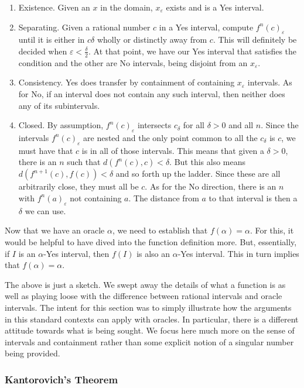 \documentclass[12pt]{article}
\begin{document}
\begin{enumerate}
    \item Existence. Given an $x$ in the domain, $x_\varepsilon$ exists and is a Yes interval. 
    \item Separating. Given a rational number $c$ in a Yes interval, compute $f^n (c)_\varepsilon$ until it is either in $c\delta$ wholly or distinctly away from $c$. This will definitely be decided when $\varepsilon < \frac{\delta}{2}$. At that point, we have our Yes interval that satisfies the condition and the other are No intervals, being disjoint from an $x_\varepsilon$. 
    \item Consistency. Yes does transfer by containment of containing $x_\varepsilon$ intervals. As for No, if an interval does not contain any such interval, then neither does any of its subintervals. 
    \item Closed. By assumption, $f^n(c)_\varepsilon$ intersects $c_\delta$ for all $\delta > 0$ and all $n$. Since the intervals $f^n(c)_\varepsilon$ are nested and the only point common to all the $c_\delta$ is $c$, we must have that $c$ is in all of those intervals. This means that given a $\delta > 0$, there is an $n$ such that $d(f^n(c), c) < \delta$. But this also means $d(f^{n+1}(c), f(c))< \delta$ and so forth up the ladder. Since these are all arbitrarily close, they must all be $c$. As for the No direction, there is an $n$ with $f^n(a)_\varepsilon$ not containing $a$. The distance from $a$ to that interval is then a $\delta$ we can use. 
\end{enumerate}

Now that we have an oracle  $\alpha$, we need to establish that $f(\alpha) = \alpha$. For this, it would be helpful to have dived into the function definition more. But, essentially, if $I$ is an $\alpha$-Yes interval, then $f(I)$ is also an $\alpha$-Yes interval. This in turn implies that $f(\alpha) = \alpha$. 

The above is just a sketch. We swept away the details of what a function is as well as playing loose with the difference between rational intervals and oracle intervals. The intent for this section was to simply illustrate how the arguments in this standard contexts can apply with oracles. In particular, there is a different attitude towards what is being sought. We focus here much more on the sense of intervals and containment rather than some explicit notion of a singular number being provided. 


\subsubsection{Kantorovich's Theorem}
\end{document}

